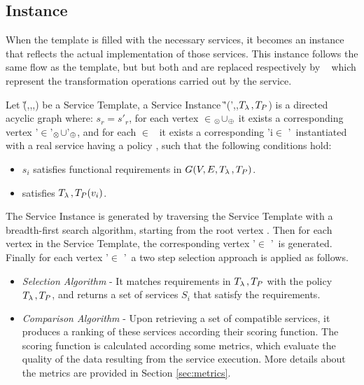 \subsection{Instance}
When the template is filled with the necessary services, it becomes an instance that reflects the actual implementation of those services.
This instance follows the same flow as the template, but but both \myLambda and \myGamma are replaced respectively by \iChartFunction~ which represent the transformation operations carried out by the service.

Let \G(\V,\E,\myLambda,\myGamma) be a Service Template, a Service Instance \G'(\V',\E,$T_{\lambda\,{}},T_P$) is a directed acyclic graph where:
$s_r=s'_r$, for each vertex \vi{}$\in$\V$_{\otimes}$$\cup$\V$_{\oplus}$ it exists a corresponding vertex \vi{}'$\in$\V'$_{\otimes}$$\cup$\V'$_{\oplus}$,
    and for each $\in$ \V\ it exists a corresponding \vi'{i}$\in$ \V'\ instantiated with a real service  having a policy , such that the following conditions hold:
    \begin{itemize}
      \item $s_i$ satisfies functional requirements in $G(V,E,T_{\lambda\,{}},T_P)$.
      \item {} satisfies $T_{\lambda\,{}},T_P(v_i)$.
    \end{itemize}

    The Service  Instance  is generated by traversing the Service Template with a breadth-first search algorithm,
    starting from the root vertex . Then for each vertex  in the Service Template, the corresponding vertex '$\in$ \V'\ is generated.
    Finally for each vertex  '$\in$ \V'\ a two step selection approach is applied as follows.
\begin{itemize}
  \item \textit{Selection Algorithm} - It matches requirements in $T_{\lambda\,{}},T_P$ with the policy $T_{\lambda\,{}},T_P$, and returns a set of services $S_i$ that satisfy the requirements.
  \item \textit{Comparison Algorithm} - Upon retrieving a set of compatible services, it produces a ranking of these services according their scoring function.
        The scoring function is calculated according some metrics, which evaluate the quality of the data resulting from the service execution.
        More details about the metrics are provided in Section \ref{sec:metrics}.
\end{itemize}




